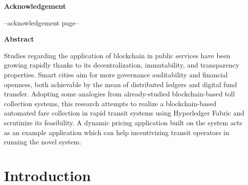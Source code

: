 \documentclass[a4paper,12pt,oneside, utf8x]{report}
\begin{document}
\linespread{1.6}\selectfont

\begin{titlepage}
\pagestyle{empty}
    \hfill \break \hfill \break
    {{\huge \centering \textbf{Acknowledgement}\par}
    \hfill \break \hfill \break
    --acknowledgement page--

    }
\end{titlepage}

\begin{titlepage}

\pagestyle{empty}
    \hfill \break \hfill \break
    {{\huge \centering \textbf{Abstract}\par}
    \hfill \break 
    Studies regarding the application of blockchain in public services have been growing rapidly thanks to its decentralization, immutability, and transparency properties. Smart cities aim for more governance auditability and financial openness, both achievable by the mean of distributed ledgers and digital fund transfer. Adopting some analogies from already-studied blockchain-based toll collection systems, this research attempts to realize a blockchain-based automated fare collection in rapid transit systems using Hyperledger Fabric and scrutinize its feasibility. A dynamic pricing application built on the system acts as an example application which can help incentivizing transit operators in running the novel system.
    }
\end{titlepage}

\setlength{\cftbeforetoctitleskip}{-4em}
\setlength{\cftaftertoctitleskip}{-1.3em}
\setlength{\cftbeforeloftitleskip}{-4em}
\setlength{\cftafterloftitleskip}{-1.3em}
\setlength{\cftbeforelottitleskip}{-4em}
\setlength{\cftafterlottitleskip}{-1.3em}


\renewcommand{\contentsname}{\hfill Table of Contents \hfill}
\renewcommand{\cftaftertoctitle}{\hfill}
\tableofcontents
\newpage
\renewcommand{\listfigurename}{\hfill List of Figures \hfill}
\listoffigures
\newpage
\renewcommand{\listtablename}{\hfill List of Tables \hfill}
\listoftables


\chapter{Introduction}
\label{cintro}
\end{document}
